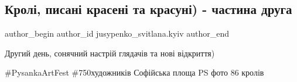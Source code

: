  
 
 
 
 
 
\subsection{Кролі, писані красені та красуні) - частина друга}
\label{sec:06_04_2018.fb.jusypenko_svitlana.kyiv.1.kroli_kraseni_2}
 
\ifcmt
 author_begin
   author_id jusypenko_svitlana.kyiv
 author_end
\fi

Другий день, сонячний настрій глядачів та нові відкриття) 

\#PysankaArtFest \#750художників Софійська площа PS фото 86 кролів
